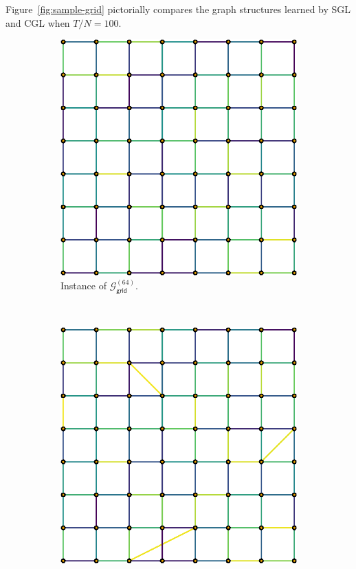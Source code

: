 Figure~\ref{fig:sample-grid} pictorially compares the graph structures learned by \textsf{SGL} and \textsf{CGL} when
$T/N = 100$.

\begin{figure}[!htb]
    \centering
    \begin{subfigure}[b]{0.3\textwidth}
        \includegraphics[width=\textwidth]{grid/true_grid.eps}
        \caption{Instance of $\mathcal{G}^{(64)}_{\mathsf{grid}}$.}
    \end{subfigure}
    ~ %
    \begin{subfigure}[b]{0.3\textwidth}
        \includegraphics[width=\textwidth]{grid/sgl_grid.eps}

\end{subfigure}
\end{figure}
